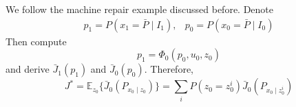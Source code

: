\begin{example}
We follow the machine repair example discussed before.
Denote
\[
\begin{array}{ll}
p_1=P(x_1=\bar{P}\mid I_1),
&
p_0=P(x_0=\bar{P}\mid I_0)
\end{array}
\]
Then compute
\[
p_1=\Phi_0(p_0,u_0,z_0)
\]
and derive $\bar{J}_1(p_1)$ and $\bar{J}_0(p_0)$.
Therefore,
\[
J^*=\mathbb{E}_{z_0}\{\bar{J}_0(P_{x_0\mid z_0})\}=\sum_iP(z_0=z_0^i)\bar{J}_0(P_{x_0\mid z_0^i})
\]





\end{example}
























